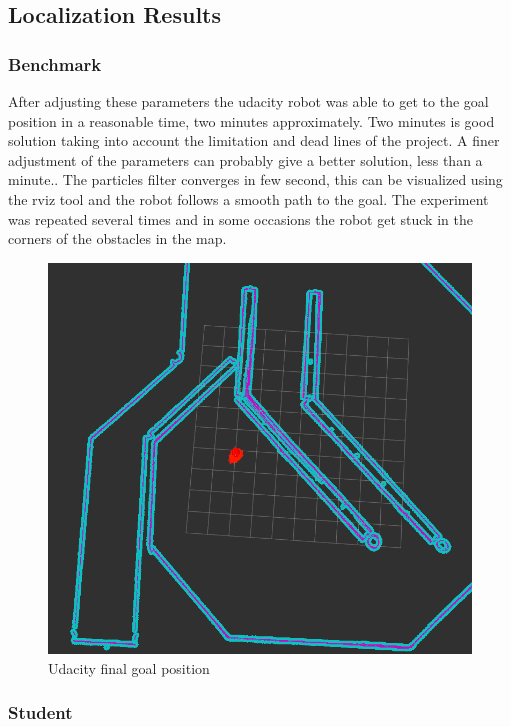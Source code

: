 \documentclass[10pt,journal,compsoc]{IEEEtran}
\begin{document}
\subsection{Localization Results}
\subsubsection{Benchmark}

After adjusting these parameters the udacity robot was able to get to the goal position in a reasonable time, two minutes approximately. Two minutes is  good solution taking into account the limitation and dead lines of the project. A finer adjustment of the parameters can probably give a better solution, less than a minute.. The particles filter converges in few second, this can be visualized using the rviz tool and the robot follows a smooth path to the goal. The experiment was repeated several times and in some occasions the robot get stuck in the corners of the obstacles in the map. 

\begin{figure}[h]
\centering
\includegraphics[scale=0.25]{rviz-robot-udacity-goal-position}
\caption{Udacity final goal position}
\label{fig:mesh3}
\end{figure}

\subsubsection{Student}
\end{document}
